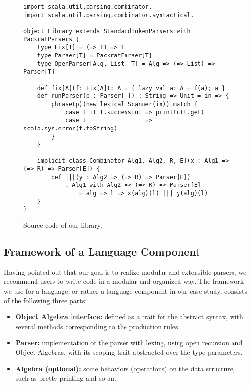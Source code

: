 \begin{figure}[htbp]
\centering
\begin{lstlisting}
import scala.util.parsing.combinator._
import scala.util.parsing.combinator.syntactical._

object Library extends StandardTokenParsers with PackratParsers {
    type Fix[T] = (=> T) => T
    type Parser[T] = PackratParser[T]
    type OpenParser[Alg, List, T] = Alg => (=> List) => Parser[T]

    def fix[A](f: Fix[A]): A = { lazy val a: A = f(a); a }
    def runParser(p : Parser[_]) : String => Unit = in => {
        phrase(p)(new lexical.Scanner(in)) match {
            case t if t.successful => println(t.get)
            case t                 => scala.sys.error(t.toString)
        }
    }

    implicit class Combinator[Alg1, Alg2, R, E](x : Alg1 => (=> R) => Parser[E]) {
        def |||(y : Alg2 => (=> R) => Parser[E])
            : Alg1 with Alg2 => (=> R) => Parser[E]
                = alg => l => x(alg)(l) ||| y(alg)(l)
    }
}
\end{lstlisting}
\caption{Source code of our library.}\label{fig:sourcelibrary}
\end{figure}

\subsection{Framework of a Language Component}\label{subsec:framework}


Having pointed out that our goal is to realize modular and extensible parsers, we recommend users to write code in a modular and
organized way. The framework we use for a language, or rather a language component in our case study, consists of the following three
parts:
\begin{itemize}
    \item \textbf{Object Algebra interface:} defined as a trait for the abstract syntax, with several methods corresponding to the production rules. 
\item \textbf{Parser:} implementation of the parser with lexing, using open recursion and Object Algebras, with its scoping trait abstracted over the type parameters.
\item \textbf{Algebra (optional):} some behaviors (operations) on the data structure, such as pretty-printing and so on.
\end{itemize}

